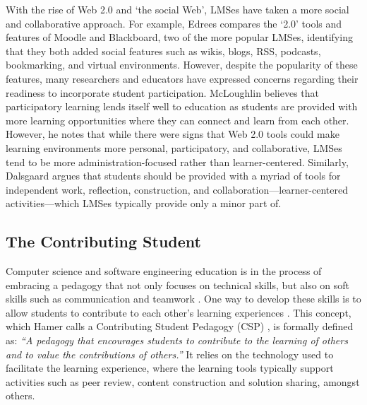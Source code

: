 With the rise of Web 2.0 and `the social Web', LMSes have taken a more social and collaborative approach. For example, Edrees\cite{edrees2013elearning} compares the `2.0' tools and features of Moodle and Blackboard, two of the more popular LMSes, identifying that they both added social features such as wikis, blogs, RSS, podcasts, bookmarking, and virtual environments. However, despite the popularity of these features, many researchers and educators have expressed concerns regarding their readiness to incorporate student participation. McLoughlin \cite{mcloughlin2007social} believes that participatory learning lends itself well to education as students are provided with more learning opportunities where they can connect and learn from each other. However, he notes that while there were signs that Web 2.0 tools could make learning environments more personal, participatory, and collaborative, LMSes tend to be more administration-focused rather than learner-centered. Similarly, Dalsgaard \cite{dalsgaard2006social} argues that students should be provided with a myriad of tools for independent work, reflection, construction, and collaboration---learner-centered activities---which LMSes typically provide only a minor part of.

\subsection{The Contributing Student}
Computer science and software engineering education is in the process of embracing a pedagogy that not only focuses on technical skills, but also on soft skills such as communication and teamwork \cite{jazayeri2004education}. One way to develop these skills is to allow students to contribute to each other's learning experiences \cite{hamer2006some}. This concept, which Hamer calls a Contributing Student Pedagogy (CSP) \cite{hamer2008contributing}, is formally defined as: \textit{``A pedagogy that encourages students to contribute to the learning of others and to value the contributions of others.''} It relies on the technology used to facilitate the learning experience, where the learning tools typically support activities such as peer review, content construction and solution sharing, amongst others.

